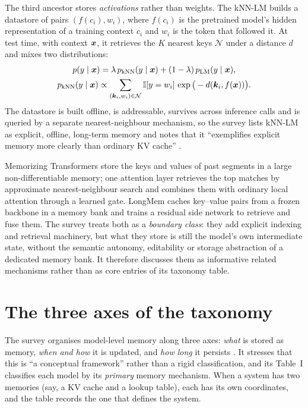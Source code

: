 The third ancestor stores \emph{activations} rather than weights. The kNN-LM
\citep{khandelwal2020knnlm} builds a datastore of pairs $(f(c_i), w_i)$, where $f(c_i)$ is the
pretrained model's hidden representation of a training context $c_i$ and $w_i$ is the token that
followed it. At test time, with context $\bm{x}$, it retrieves the $K$ nearest keys $\mathcal{N}$
under a distance $d$ and mixes two distributions:
\begin{equation}\label{eq:c02-knnlm}
\begin{gathered}
  p(y\mid\bm{x}) = \lambda\,p_{\mathrm{kNN}}(y\mid\bm{x}) + (1-\lambda)\,p_{\mathrm{LM}}(y\mid\bm{x}),
  \\
  p_{\mathrm{kNN}}(y\mid\bm{x}) \propto \sum_{(\bm{k}_i, w_i)\in\mathcal{N}} \mathbb{I}[y = w_i]\,
  \exp\big(-d(\bm{k}_i, f(\bm{x}))\big).
\end{gathered}
\end{equation}
The datastore is built offline, is addressable, survives across inference calls and is queried by
a separate nearest-neighbour mechanism, so the survey lists kNN-LM as explicit, offline,
long-term memory and notes that it ``exemplifies explicit memory more clearly than ordinary KV
cache'' \citep[\S IV-B]{zhoubian2026memory}.

Memorizing Transformers \citep{wu2022memorizing} store the keys and values of past segments in a
large non-differentiable memory; one attention layer retrieves the top matches by approximate
nearest-neighbour search and combines them with ordinary local attention through a learned gate.
LongMem \citep{wang2023longmem} caches key--value pairs from a frozen backbone in a memory bank
and trains a residual side network to retrieve and fuse them. The survey treats both as a
\emph{boundary class}: they add explicit indexing and retrieval machinery, but what they store is
still the model's own intermediate state, without the semantic autonomy, editability or storage
abstraction of a dedicated memory bank. It therefore discusses them as informative related
mechanisms rather than as core entries of its taxonomy table.

\section{The three axes of the taxonomy}\label{sec:c02-axes}

The survey organises model-level memory along three axes: \emph{what} is stored as memory,
\emph{when and how} it is updated, and \emph{how long} it persists \citep[\S II]{zhoubian2026memory}.
It stresses that this is ``a conceptual framework'' rather than a rigid classification, and its
Table~I classifies each model by its \emph{primary} memory mechanism. When a system has two memories
(say, a KV cache and a lookup table), each has its own coordinates, and the table records the one
that defines the system.


